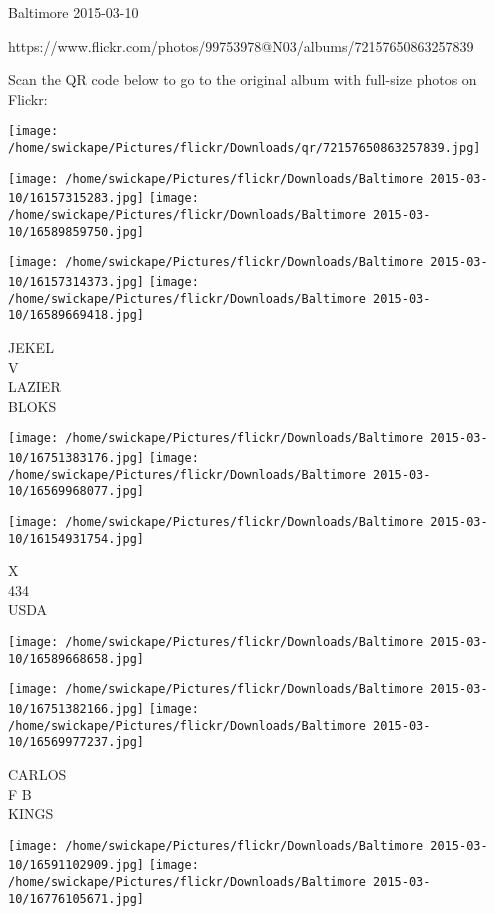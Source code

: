 \documentclass[10pt,letterpaper]{article}
\begin{document}
Baltimore 2015-03-10

https://www.flickr.com/photos/99753978@N03/albums/72157650863257839

Scan the QR code below to go to the original album with full-size photos on Flickr:

\texttt{[image: /home/swickape/Pictures/flickr/Downloads/qr/72157650863257839.jpg]}
\pagebreak

\texttt{[image: /home/swickape/Pictures/flickr/Downloads/Baltimore 2015-03-10/16157315283.jpg]}
\texttt{[image: /home/swickape/Pictures/flickr/Downloads/Baltimore 2015-03-10/16589859750.jpg]}

\texttt{[image: /home/swickape/Pictures/flickr/Downloads/Baltimore 2015-03-10/16157314373.jpg]}
\texttt{[image: /home/swickape/Pictures/flickr/Downloads/Baltimore 2015-03-10/16589669418.jpg]}

JEKEL\\
V\\
LAZIER\\
BLOKS
\pagebreak

\texttt{[image: /home/swickape/Pictures/flickr/Downloads/Baltimore 2015-03-10/16751383176.jpg]}
\texttt{[image: /home/swickape/Pictures/flickr/Downloads/Baltimore 2015-03-10/16569968077.jpg]}

\texttt{[image: /home/swickape/Pictures/flickr/Downloads/Baltimore 2015-03-10/16154931754.jpg]}

X\\
434\\
USDA
\pagebreak

\texttt{[image: /home/swickape/Pictures/flickr/Downloads/Baltimore 2015-03-10/16589668658.jpg]}

\vspace{0.25in}
\texttt{[image: /home/swickape/Pictures/flickr/Downloads/Baltimore 2015-03-10/16751382166.jpg]}
\texttt{[image: /home/swickape/Pictures/flickr/Downloads/Baltimore 2015-03-10/16569977237.jpg]}

CARLOS\\
F B\\
KINGS
\pagebreak

\texttt{[image: /home/swickape/Pictures/flickr/Downloads/Baltimore 2015-03-10/16591102909.jpg]}
\texttt{[image: /home/swickape/Pictures/flickr/Downloads/Baltimore 2015-03-10/16776105671.jpg]}
\end{document}
